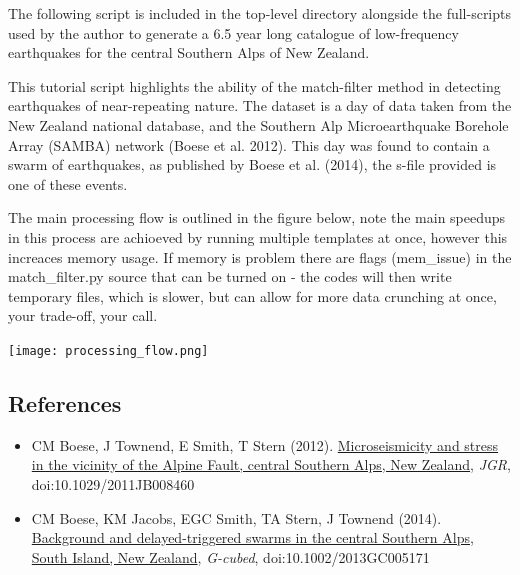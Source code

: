 \documentclass[a4paper,10pt,english]{sphinxmanual}
\begin{document}
The following script is included in the top-level directory alongside the full-scripts
used by the author to generate a 6.5 year long catalogue of low-frequency earthquakes
for the central Southern Alps of New Zealand.

This tutorial script highlights the ability of the match-filter method in detecting
earthquakes of near-repeating nature.  The dataset is a day of data taken from the
New Zealand national database, and the Southern Alp Microearthquake Borehole Array
(SAMBA) network (Boese et al. 2012).  This day was found to contain a swarm of
earthquakes, as published by Boese et al. (2014), the s-file provided is one of
these events.

The main processing flow is outlined in the figure below, note the main speedups
in this process are achioeved by running multiple templates at once, however this
increaces memory usage.  If memory is problem there are flags (mem\_issue) in the
match\_filter.py source that can be turned on - the codes will then write temporary
files, which is slower, but can allow for more data crunching at once, your trade-off,
your call.

{\hfill\texttt{[image: processing\_flow.png]}\hfill}


\subsection{References}
\label{tutorial:references}\begin{itemize}
\item {} 
CM Boese, J Townend, E Smith, T Stern (2012). \href{http://onlinelibrary.wiley.com/doi/10.1029/2011JB008460/full}{Microseismicity and stress in the vicinity of the Alpine Fault, central Southern Alps, New Zealand}, \emph{JGR}, doi:10.1029/2011JB008460

\item {} 
CM Boese, KM Jacobs, EGC Smith, TA Stern, J Townend (2014). \href{http://onlinelibrary.wiley.com/doi/10.1002/2013GC005171/full}{Background and delayed-triggered swarms in the central Southern Alps, South Island, New Zealand}, \emph{G-cubed}, doi:10.1002/2013GC005171

\end{itemize}
\end{document}
